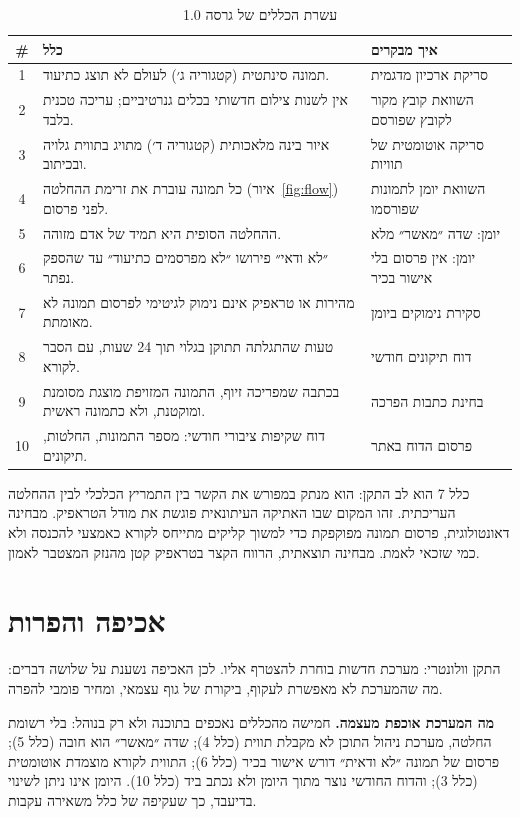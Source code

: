 \begin{table}[!htb]\centering
\caption{עשרת הכללים של  גרסה \num{1.0}}\label{tab:truth}
\small
\begin{tabularx}{\linewidth}{@{}c Y Y@{}}
\toprule
\textbf{\#} & \textbf{כלל} & \textbf{איך מבקרים} \\
\midrule
\num{1} & תמונה סינתטית (קטגוריה ג׳) לעולם לא תוצג כתיעוד. & סריקת ארכיון מדגמית \\
\num{2} & אין לשנות צילום חדשותי בכלים גנרטיביים; עריכה טכנית בלבד. & השוואת קובץ מקור לקובץ שפורסם \\
\num{3} & איור בינה מלאכותית (קטגוריה ד׳) מתויג בתווית גלויה ובכיתוב. & סריקה אוטומטית של תוויות \\
\num{4} & כל תמונה עוברת את זרימת ההחלטה (איור~\ref{fig:flow}) לפני פרסום. & השוואת יומן לתמונות שפורסמו \\
\num{5} & ההחלטה הסופית היא תמיד של אדם מזוהה. & יומן: שדה ״מאשר״ מלא \\
\num{6} & ״לא ודאי״ פירושו ״לא מפרסמים כתיעוד״ עד שהספק נפתר. & יומן: אין פרסום בלי אישור בכיר \\
\num{7} & מהירות או טראפיק אינם נימוק לגיטימי לפרסום תמונה לא מאומתת. & סקירת נימוקים ביומן \\
\num{8} & טעות שהתגלתה תתוקן בגלוי תוך \num{24} שעות, עם הסבר לקורא. & דוח תיקונים חודשי \\
\num{9} & בכתבה שמפריכה זיוף, התמונה המזויפת מוצגת מסומנת ומוקטנת, ולא כתמונה ראשית. & בחינת כתבות הפרכה \\
\num{10} & דוח שקיפות ציבורי חודשי: מספר התמונות, החלטות, תיקונים. & פרסום הדוח באתר \\
\bottomrule
\end{tabularx}
\end{table}


כלל \num{7} הוא לב התקן: הוא מנתק במפורש את הקשר בין התמריץ הכלכלי לבין ההחלטה העריכתית. זהו המקום שבו האתיקה העיתונאית פוגשת את מודל הטראפיק. מבחינה דאונטולוגית, פרסום תמונה מפוקפקת כדי למשוך קליקים מתייחס לקורא כאמצעי להכנסה ולא כמי שזכאי לאמת. מבחינה תוצאתית, הרווח הקצר בטראפיק קטן מהנזק המצטבר לאמון.

\section{אכיפה והפרות}\label{sec:enforce}
התקן וולונטרי: מערכת חדשות בוחרת להצטרף אליו. לכן האכיפה נשענת על שלושה דברים: מה שהמערכת לא מאפשרת לעקוף, ביקורת של גוף עצמאי, ומחיר פומבי להפרה.

\textbf{מה המערכת אוכפת מעצמה.} חמישה מהכללים נאכפים בתוכנה ולא רק בנוהל: בלי רשומת החלטה, מערכת ניהול התוכן לא מקבלת תווית (כלל \num{4}); שדה ״מאשר״ הוא חובה (כלל \num{5}); פרסום של תמונה ״לא ודאית״ דורש אישור בכיר (כלל \num{6}); התווית לקורא מוצמדת אוטומטית (כלל \num{3}); והדוח החודשי נוצר מתוך היומן ולא נכתב ביד (כלל \num{10}). היומן אינו ניתן לשינוי בדיעבד, כך שעקיפה של כלל משאירה עקבות.

